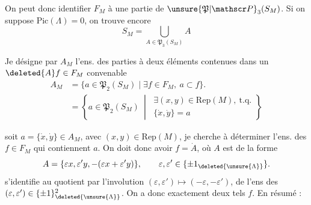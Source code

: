 On peut donc identifier $F_M$ à une partie de $\unsure{\mathfrak P|\mathscr P}_3(S_M)$. Si on suppose \uline{$\mathrm{Pic}(\Lambda)=0$}, on trouve encore
\[
S_M=\bigcup_{A\in\mathfrak P_3(S_M)}A\tag*{(19)}
\]

Je désigne par $A_M$ l'ens. des parties à deux éléments  contenues dans un $\deleted{A}f\in F_M$ convenable
\[
\begin{aligned}
A_M&=\{a\in\mathfrak P_2(S_M)\mid\exists f\in F_M,\ a\subset f\}.\\
&=\left\{a\in\mathfrak P_2(S_M)\ \middle|\ 
\begin{gathered}\exists(x,y)\in\mathrm{Rep}(M),\ \text{t.q.}\\ \{\dot x,\dot y\}=a\end{gathered}\right\}
\end{aligned}\tag*{(20)}
\]
 

soit $a=\{\dot x,\dot y\}\in A_M$, avec $(x,y)\in\mathrm{Rep}(M)$, je cherche à déterminer l'ens. des $f\in F_M$ qui contiennent $a$. On doit donc avoir $f=\dot A$, où $A$ est de la forme
\[
A=\{\varepsilon x,\varepsilon'y,-(\varepsilon x+\varepsilon'y)\},\qquad \varepsilon,\varepsilon'\in\{\pm1_{\deleted{\unsure{\Lambda}}}\}.
\]
  s'identifie au quotient par l'involution $(\varepsilon,\varepsilon')\mapsto(-\varepsilon,-\varepsilon')$, de l'ens des $(\varepsilon,\varepsilon')\in\{\pm1\}_{\deleted{\unsure{\Lambda}}}^2$. On a donc exactement deux tels $f$. En résumé :

